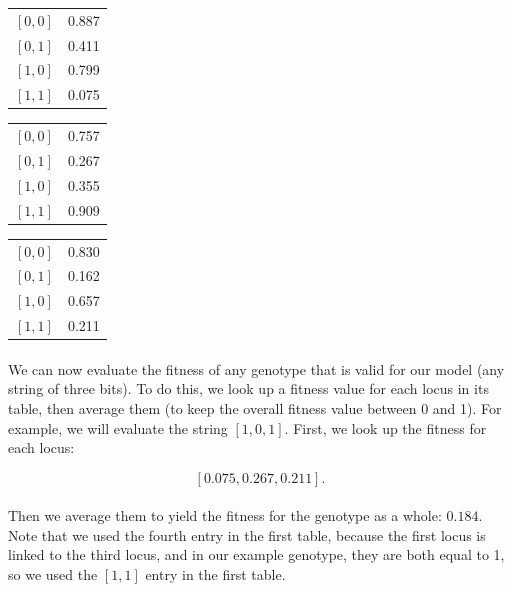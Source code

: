 \documentclass[12pt,letterpaper,titlepage]{article}
\begin{document}
\begin{center}
    \begin{tabular}{l l}
        $\left[0, 0\right]$ & 0.887 \\
        $\left[0, 1\right]$ & 0.411 \\
        $\left[1, 0\right]$ & 0.799 \\
        $\left[1, 1\right]$ & 0.075 \\
    \end{tabular}
    \quad
    \begin{tabular}{l l}
        $\left[0, 0\right]$ & 0.757 \\
        $\left[0, 1\right]$ & 0.267 \\
        $\left[1, 0\right]$ & 0.355 \\
        $\left[1, 1\right]$ & 0.909 \\
    \end{tabular}
    \quad
    \begin{tabular}{l l}
        $\left[0, 0\right]$ & 0.830 \\
        $\left[0, 1\right]$ & 0.162 \\
        $\left[1, 0\right]$ & 0.657 \\
        $\left[1, 1\right]$ & 0.211 \\
    \end{tabular}
\end{center}

\paragraph{}
We can now evaluate the fitness of any genotype that is valid for our model
(any string of three bits). To do this, we look up a fitness value for each
locus in its table, then average them (to keep the overall fitness value
between 0 and 1). For example, we will evaluate the string
$\left[1,0,1\right]$. First, we look up the fitness for each locus:

\begin{displaymath}
    \left[0.075, 0.267, 0.211\right].
\end{displaymath}

\paragraph{}
Then we average them to yield the fitness for the genotype as a whole: $0.184$.
Note that we used the fourth entry in the first table, because the first locus
is linked to the third locus, and in our example genotype, they are both equal
to 1, so we used the $\left[1, 1\right]$ entry in the first table.
\end{document}
